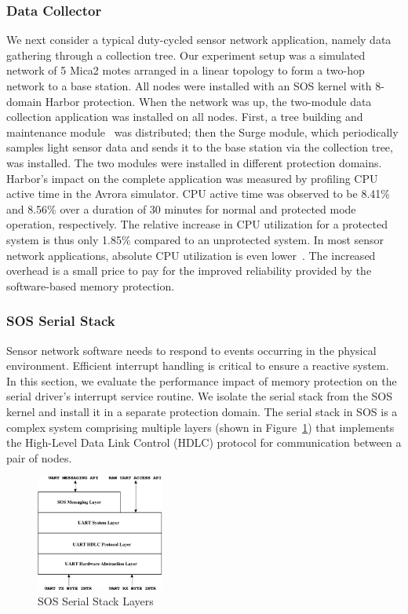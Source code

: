 \subsubsection{Data Collector}
%
We next consider a typical duty-cycled sensor network application,
namely data gathering through a collection tree.
%
Our experiment setup was a simulated network of 5 Mica2 motes arranged
in a linear topology to form a two-hop network to a base station.
%
All nodes were installed with an SOS kernel with 8-domain Harbor protection.
%
When the network was up, the two-module data collection application was
installed on all nodes.
%
First, a tree building and maintenance module~\cite{woo03surge} was
distributed; then
%
the Surge module, which periodically samples light sensor data and sends it
to the base station via the collection tree, was installed.
%
The two modules were installed in different protection domains.
%
Harbor's impact on the complete application was measured by profiling CPU
active time in the Avrora simulator.
%
CPU active time was observed to be 8.41\% and 8.56\% over a duration
of 30 minutes for normal and protected mode operation, respectively. 
%
The relative increase in CPU utilization for a protected system is
thus only 1.85\% compared to an unprotected system.
%
In most sensor network applications, absolute CPU utilization is even
lower~\cite{tkernel06sensys}.
%
The increased overhead is a small price to pay for the improved
reliability provided by the software-based memory protection.
\subsubsection{SOS Serial Stack}
%
Sensor network software needs to respond to events occurring in the
physical environment.
%
Efficient interrupt handling is critical to ensure a reactive system.
%
In this section, we evaluate the performance impact of memory
protection on the serial driver's interrupt service routine.
%
We isolate the serial stack from the SOS kernel and install it in a
separate protection domain.
%
The serial stack in SOS is a complex system comprising multiple
layers (shown in Figure~\ref{fig:serialstack}) that implements the
High-Level Data Link Control (HDLC) protocol for communication between
a pair of nodes.
%
\begin{figure}[htbp]
  \centering
   \includegraphics[height = 1.5in,
   keepaspectratio=true]{figures/serialstack.eps} 
   \caption{SOS Serial Stack Layers}
   \label{fig:serialstack}
\end{figure}
%

